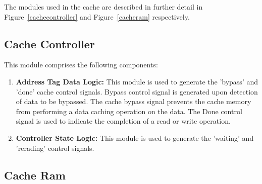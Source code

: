 The modules used in the cache are described in further detail in Figure~\ref{cachecontroller} and
Figure~\ref{cacheram} respectively.

\subsection{Cache Controller}

This module comprises the following components: 
\begin{enumerate}
\item \textbf{Address Tag Data Logic: }This module is used to generate the 'bypass' and 'done' cache control signals. Bypass control signal is generated upon detection of data to be bypassed. The cache bypass signal prevents the cache memory from performing a data caching operation on the data. The Done control signal is used to indicate the completion of a read or write operation.
\item \textbf{Controller State Logic: }This module is used to generate the 'waiting' and 'rerading' control signals.
\end{enumerate}

\subsection{Cache Ram}


